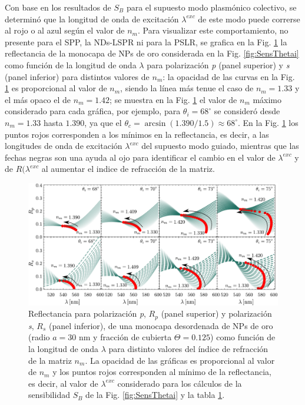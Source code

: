 Con base en los resultados de $S_B$ para el supuesto modo  plasmónico colectivo, se determinó que la longitud de onda de excitación $\lambda^{exc}$ de este modo puede correrse al rojo o al azul según el valor de $n_m$. Para visualizar este comportamiento, no presente para el SPP, la NDs-LSPR ni para la PSLR, se grafica en la Fig. \ref{fig:SensRpRs} la reflectancia de la monocapa de NPs de oro considerada en la Fig. \ref{fig:SensThetai} como función de la longitud de onda $\lambda$ para polarización \emph{p} (panel superior) y \emph{s} (panel inferior) para distintos valores de $n_m$: la opacidad de las curvas en la Fig. \ref{fig:SensRpRs} es proporcional al valor de $n_m$, siendo la línea más tenue el caso de $n_m=1.33$ y el más opaco el de $n_m=1.42$; se muestra en la Fig. \ref{fig:SensRpRs} el valor de $n_m$ máximo considerado para cada gráfica, por ejemplo, para $\theta_i=68^\circ$ se consideró desde $n_m=1.33$ hasta $1.390$, ya que el $\theta_c=\arcsin(1.390/1.5)\approx 68^\circ$. En la Fig. \ref{fig:SensRpRs} los puntos rojos corresponden a los mínimos en la reflectancia, es decir, a las longitudes de onda de excitación $\lambda^{exc}$ del supuesto modo guiado, mientras que las fechas negras son una ayuda al ojo para identificar el cambio en el valor de $\lambda^{exc}$ y de $R(\lambda^{exc}$ al aumentar el indice de refracción de la matriz.

\begin{figure}[h!]\centering
	\includegraphics[width=1\linewidth]{2-Resultados/figs/11-SPPCSM/2-RpRs}\vspace*{-.7em}%
\caption{Reflectancia para polarización \emph{p}, $R_p$ (panel superior) y polarización \emph{s}, $R_s$ (panel inferior), de una monocapa desordenada de NPs de oro (radio $a=30$ nm y fracción de cubierta $\Theta=0.125$)  como función de la longitud de onda $\lambda$ para distinto valores del  índice de refracción de la matriz $n_m$. La opacidad de las gráficas es proporcional al valor de $n_m$  y los puntos rojos corresponden al mínimo de la reflectancia, es decir, al valor de $\lambda^{exc}$ considerado para los cálculos de la sensibilidad $S_B$ de la Fig. \ref{fig:SensThetai} y la tabla \ref{fig:SensRpRs}.	
	}\label{fig:SensRpRs}
	\end{figure}	

